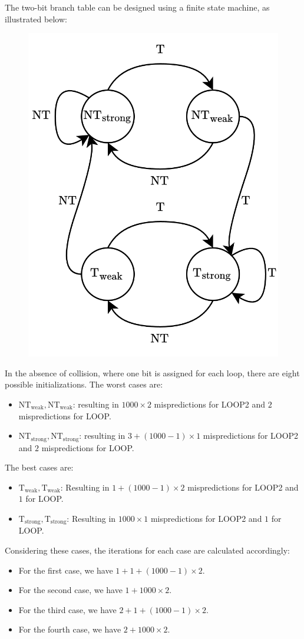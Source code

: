 The two-bit branch table can be designed using a finite state machine, as illustrated below:
\begin{figure}[H]
    \centering
    \includegraphics[width=0.4\linewidth]{images/2bht.png}
\end{figure}
In the absence of collision, where one bit is assigned for each loop, there are eight possible initializations.
The worst cases are:
\begin{itemize}
    \item $\text{NT}_{\text{weak}},\text{NT}_{\text{weak}}$: resulting in $1000 \times 2$ mispredictions for LOOP2 and $2$ mispredictions for LOOP.
    \item $\text{NT}_{\text{strong}},\text{NT}_{\text{strong}}$: resulting in $3+(1000-1)\times 1$ mispredictions for LOOP2 and $2$ mispredictions for LOOP.
\end{itemize}
The best cases are: 
\begin{itemize}
    \item $\text{T}_{\text{weak}},\text{T}_{\text{weak}}$: Resulting in $1 + (1000-1) \times 2$ mispredictions for LOOP2 and $1$ for LOOP.
    \item $\text{T}_{\text{strong}},\text{T}_{\text{strong}}$: Resulting in $1000 \times 1$ mispredictions for LOOP2 and $1$ for LOOP.
\end{itemize}

Considering these cases, the iterations for each case are calculated accordingly:
\begin{itemize}
    \item For the first case, we have $1 + 1 + (1000-1) \times 2$.
    \item For the second case, we have $1 +1000 \times 2$.
    \item For the third case, we have $2 + 1 + (1000-1) \times 2$.
    \item For the fourth case, we have $2 +1000 \times 2$.
\end{itemize}


